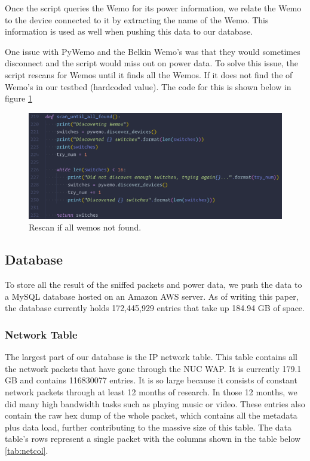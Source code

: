Once the script queries the Wemo for its power information, we relate the Wemo to the device connected to it by extracting the name of the Wemo. This information is used as well when pushing this data to our database.

One issue with PyWemo and the Belkin Wemo's was that they would sometimes disconnect and the script would miss out on power data. To solve this issue, the script rescans for Wemos until it finds all the Wemos. If it does not find the of Wemo's in our testbed (hardcoded value). The code for this is shown below in figure \ref{fig:wemoRescanCode}

\begin{figure}[H]
    \centering
    \includegraphics[width=1\textwidth]{figures/wemoRescanCode.png}
    \caption{Rescan if all wemos not found.}
    \label{fig:wemoRescanCode}
\end{figure}

\subsection{Database}
\label{Database}

To store all the result of the sniffed packets and power data, we push the data to a MySQL database hosted on an Amazon AWS server. As of writing this paper, the database currently holds 172,445,929 entries that take up 184.94 GB of space.

\subsubsection{Network Table}

The largest part of our database is the IP network table. This table contains all the network packets that have gone through the NUC WAP. It is currently 179.1 GB and contains 116830077 entries. It is so large because it consists of constant network packets through at least 12 months of research. In those 12 months, we did many high bandwidth tasks such as playing music or video. These entries also contain the raw hex dump of the whole packet, which contains all the metadata plus data load, further contributing to the massive size of this table. The data table's rows represent a single packet with the columns shown in the table below \ref{tab:netcol}.


